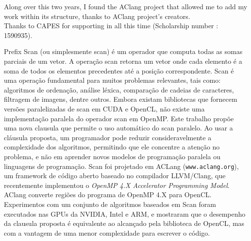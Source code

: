 \documentclass[Ingles]{ic-tese-v1}
\newcommand{\tit}[1]{{\textit{#1}}}
\begin{document}
Along over this two years, I found the AClang project that allowed me to add my work within its structure, thanks to AClang project's creators.\\
Thanks to CAPES for supporting in all this time (Scholarship number : 1590935).


\begin{resumo}
Prefix Scan (ou simplesmente scan) é um operador que computa todas as somas
parciais de um vetor. A operação scan retorna um vetor onde cada elemento é a
soma de todos os elementos precedentes até a posição correspondente. Scan é uma
operação fundamental para muitos problemas relevantes, tais como: algoritmos de
ordenação, análise léxica, comparação de cadeias de caracteres, filtragem de
imagens, dentre outros. Embora existam bibliotecas que fornecem versões
paralelizadas de scan em CUDA e OpenCL, não existe uma implementação paralela
do operador scan em OpenMP. Este trabalho propõe uma nova clausula que permite
o uso automático do scan paralelo. Ao usar a cláusula proposta, um programador
pode reduzir consideravelmente a complexidade dos algoritmos, permitindo que
ele concentre a atenção no problema, e não em aprender novos modelos de
programação paralela ou linguagens de programação. Scan foi projetado em ACLang
(\texttt{www.aclang.org}), um framework de código aberto baseado no compilador
LLVM/Clang, que recentemente implementou o \tit{OpenMP 4.X Accelerator Programming
Model}. AClang converte regiões do programa de OpenMP 4.X para OpenCL.
Experimentos com um conjunto de algoritmos baseados em Scan foram executados
nas GPUs da NVIDIA, Intel e ARM, e mostraram que o desempenho da
clausula proposta  é equivalente ao alcançado pela biblioteca de OpenCL, mas com a
vantagem de uma menor complexidade para escrever o código.
\end{resumo}
\end{document}
